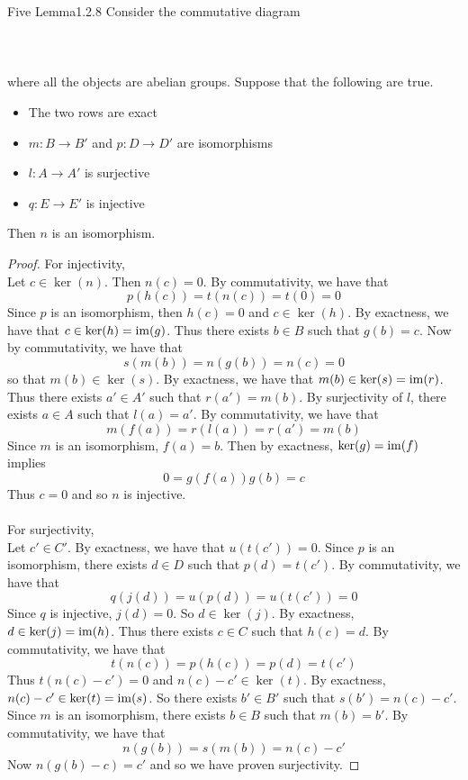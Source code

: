 \documentclass[a4paper]{article}
\begin{document}
\begin{lmm}{Five Lemma}{1.2.8} Consider the commutative diagram \\~\\
\\~\\
where all the objects are abelian groups. Suppose that the following are true. 
\begin{itemize}
\item The two rows are exact
\item $m:B\to B'$ and $p:D\to D'$ are isomorphisms
\item $l:A\to A'$ is surjective
\item $q:E\to E'$ is injective
\end{itemize}
Then $n$ is an isomorphism. \tcbline
\begin{proof}
For injectivity, \\
Let $c\in\ker(n)$. Then $n(c)=0$. By commutativity, we have that $$p(h(c))=t(n(c))=t(0)=0$$ Since $p$ is an isomorphism, then $h(c)=0$ and $c\in\ker(h)$. By exactness, we have that $c\in\ker(h)=\operatorname{im}(g)$. Thus there exists $b\in B$ such that $g(b)=c$. Now by commutativity, we have that $$s(m(b))=n(g(b))=n(c)=0$$ so that $m(b)\in\ker(s)$. By exactness, we have that $m(b)\in\ker(s)=\operatorname{im}(r)$. Thus there exists $a'\in A'$ such that $r(a')=m(b)$. By surjectivity of $l$, there exists $a\in A$ such that $l(a)=a'$. By commutativity, we have that $$m(f(a))=r(l(a))=r(a')=m(b)$$ Since $m$ is an isomorphism, $f(a)=b$. Then by exactness, $\ker(g)=\operatorname{im}(f)$ implies $$0=g(f(a))g(b)=c$$ Thus $c=0$ and so $n$ is injective. \\~\\

For surjectivity, \\
Let $c'\in C'$. By exactness, we have that $u(t(c'))=0$. Since $p$ is an isomorphism, there exists $d\in D$ such that $p(d)=t(c')$. By commutativity, we have that $$q(j(d))=u(p(d))=u(t(c'))=0$$ Since $q$ is injective, $j(d)=0$. So $d\in\ker(j)$. By exactness, $d\in\ker(j)=\operatorname{im}(h)$. Thus there exists $c\in C$ such that $h(c)=d$. By commutativity, we have that $$t(n(c))=p(h(c))=p(d)=t(c')$$ Thus $t(n(c)-c')=0$ and $n(c)-c'\in\ker(t)$. By exactness, $n(c)-c'\in\ker(t)=\operatorname{im}(s)$. So there exists $b'\in B'$ such that $s(b')=n(c)-c'$. Since $m$ is an isomorphism, there exists $b\in B$ such that $m(b)=b'$. By commutativity, we have that $$n(g(b))=s(m(b))=n(c)-c'$$ Now $n(g(b)-c)=c'$ and so we have proven surjectivity. 
\end{proof}
\end{lmm}
\end{document}
